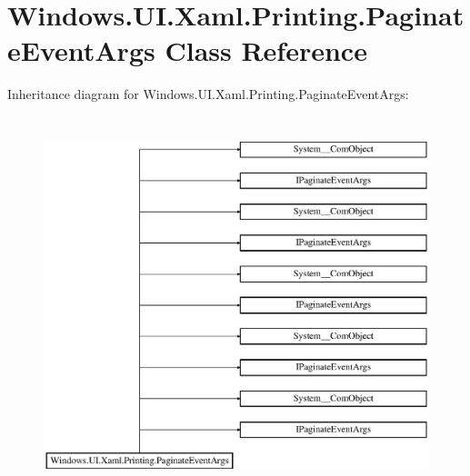 \hypertarget{class_windows_1_1_u_i_1_1_xaml_1_1_printing_1_1_paginate_event_args}{}\section{Windows.\+U\+I.\+Xaml.\+Printing.\+Paginate\+Event\+Args Class Reference}
\label{class_windows_1_1_u_i_1_1_xaml_1_1_printing_1_1_paginate_event_args}
Inheritance diagram for Windows.\+U\+I.\+Xaml.\+Printing.\+Paginate\+Event\+Args\+:\begin{figure}[H]
\begin{center}
\leavevmode
\includegraphics[height=11.000000cm]{class_windows_1_1_u_i_1_1_xaml_1_1_printing_1_1_paginate_event_args}
\end{center}
\end{figure}
